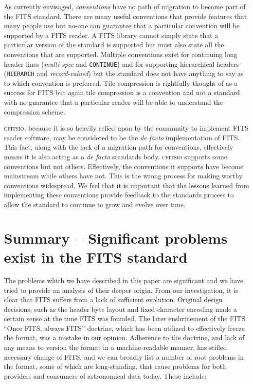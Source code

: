 \documentclass[final,authoryear,5p,times,twocolumn]{elsarticle}
\begin{document}
{{As currently envisaged, \emph{conventions} have no path of migration
to become part of the FITS standard. There are many useful conventions
that provide features that many people use but no-one can guarantee
that a particular convention will be supported by a FITS reader. A
FITS library cannot simply state that a particular version of the
standard is supported but must also state all the conventions that are
supported. Multiple conventions exist for
continuing long header lines (\emph{multi-spec} and \texttt{CONTINUE})
and for supporting hierarchical headers (\texttt{HIERARCH} and
\emph{record-valued}) but the standard does not have anything to say
as to which convention is preferred. Tile compression is rightfully
thought of as a success for FITS but again tile compression
\citep[e.g.,][]{2007ASPC..376..483S,2009PASP..121..414P} is a
convention and not a standard with no guarantee that a particular
reader will be able to understand the compression scheme.

\textsc{cfitsio,} because it is so heavily relied upon by the 
community to implement FITS reader software, may be considered to
be the \emph{de facto} implementation of FITS. This fact, along
with the lack of a migration path for conventions, effectively means
it is also acting as a \emph{de facto} standards body. \textsc{cfitsio}
supports some conventions but not others. 
Effectively, the conventions it supports have become mainstream 
while others have not. This is the wrong process for
making worthy conventions widespread. We feel that it is important 
that the lessons learned from implementing these conventions provide
feedback to the standards process to allow the standard to continue 
to grow and evolve over time.

\section{Summary -- Significant problems exist in the FITS standard}


The problems which we have described in this paper are significant
and we have tried to provide an analysis of their deeper origin.
From our investigation, it is clear that FITS suffers from a lack of
sufficient evolution. Original design decisions, such as the header
byte layout and fixed character encoding made a certain sense at the
time FITS was founded. The later enshrinement of the FITS ``Once FITS, always
FITS'' doctrine, which has been utilized to effectively freeze the format, 
was a mistake in our opinion.  Adherence to the doctrine, and lack of 
any means to version the format in a machine-readable manner, has 
stifled necessary change of FITS, and we can broadly list a number of 
root problems in the format, some of which are long-standing, that 
cause problems for both providers and consumers of astronomical data today. 
These include:

}}
\end{document}
